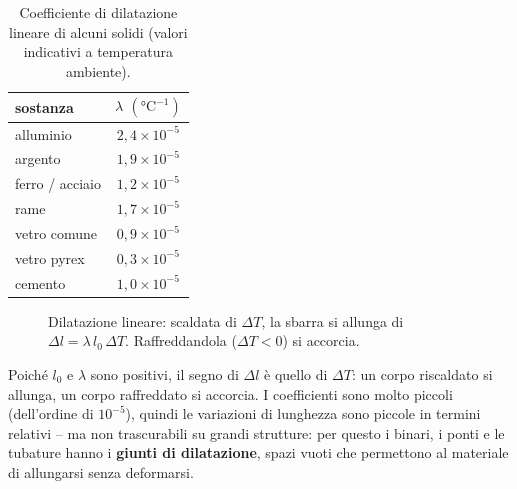 \begin{table}[!htbp]
    \centering
    \begin{tabular}{lc}
        \toprule
        sostanza & $\lambda$ $(\si{\celsius}^{-1})$ \\
        \midrule
        alluminio & $2{,}4 \times 10^{-5}$ \\
        argento & $1{,}9 \times 10^{-5}$ \\
        ferro / acciaio & $1{,}2 \times 10^{-5}$ \\
        rame & $1{,}7 \times 10^{-5}$ \\
        vetro comune & $0{,}9 \times 10^{-5}$ \\
        vetro pyrex & $0{,}3 \times 10^{-5}$ \\
        cemento & $1{,}0 \times 10^{-5}$ \\
        \bottomrule
    \end{tabular}
    \caption{Coefficiente di dilatazione lineare di alcuni solidi (valori indicativi a temperatura ambiente).}
    \label{tab:dilatazione-lineare}
\end{table}

\begin{figure}[!htbp]
    \centering
    \caption{Dilatazione lineare: scaldata di $\Delta T$, la sbarra si allunga di $\Delta l = \lambda\,l_0\,\Delta T$. Raffreddandola ($\Delta T < 0$) si accorcia.}
    \label{fig:dilatazione-lineare}
\end{figure}

\begin{remark}
Poiché $l_0$ e $\lambda$ sono positivi, il segno di $\Delta l$ è quello di $\Delta T$: un corpo riscaldato si allunga, un corpo raffreddato si accorcia. I coefficienti sono molto piccoli (dell'ordine di $10^{-5}$), quindi le variazioni di lunghezza sono piccole in termini relativi -- ma non trascurabili su grandi strutture: per questo i binari, i ponti e le tubature hanno i \textbf{giunti di dilatazione}, spazi vuoti che permettono al materiale di allungarsi senza deformarsi.
\end{remark}

